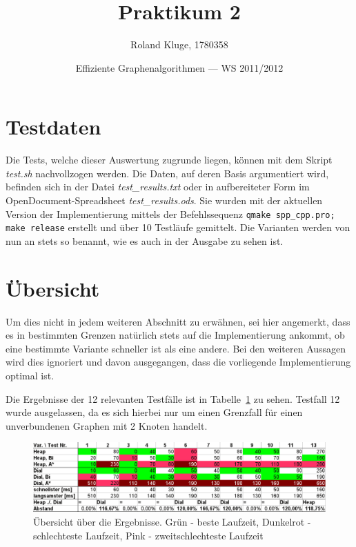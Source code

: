 \documentclass{scrartcl}
\title{Praktikum 2}
\date{Effiziente Graphenalgorithmen --- WS 2011/2012}
\author{Roland Kluge, 1780358}
\begin{document}
\maketitle

\section{Testdaten}

Die Tests, welche dieser Auswertung zugrunde liegen, können mit dem Skript
\emph{test.sh} nachvollzogen werden.
Die Daten, auf deren Basis argumentiert wird, befinden sich in der Datei
\emph{test\_results.txt} oder in aufbereiteter Form im 
OpenDocument-Spreadsheet \emph{test\_results.ods}.
Sie wurden mit der aktuellen Version der Implementierung mittels der Befehlssequenz
\texttt{qmake spp\_cpp.pro; make release} erstellt und über
10 Testläufe gemittelt.
Die Varianten werden von nun an stets so benannt, wie es auch in der Ausgabe
zu sehen ist.

\section{Übersicht}

Um dies nicht in jedem weiteren Abschnitt zu erwähnen, sei hier angemerkt,
dass es in bestimmten Grenzen natürlich stets auf die Implementierung ankommt, 
ob eine bestimmte Variante schneller ist als eine andere.
Bei den weiteren Aussagen wird dies ignoriert und davon ausgegangen, dass die
vorliegende Implementierung optimal ist.

Die Ergebnisse der 12 relevanten Testfälle ist in Tabelle~\ref{ref:results}
zu sehen. Testfall 12 wurde ausgelassen, da es sich hierbei nur um einen
Grenzfall für einen unverbundenen Graphen mit 2 Knoten handelt.

\begin{figure}[htbp]
\includegraphics[width=\textwidth]{test_results.png}
\caption{Übersicht über die Ergebnisse. Grün - beste Laufzeit, Dunkelrot - schlechteste Laufzeit, Pink - zweitschlechteste Laufzeit}
\label{ref:results}
\end{figure}
\end{document}
